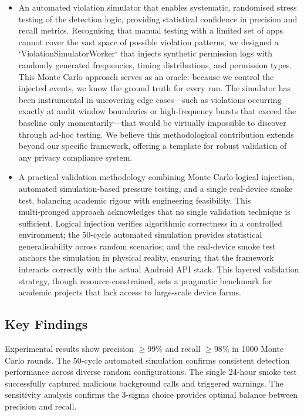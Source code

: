 \begin{itemize}
\item An automated violation simulator that enables systematic, randomised stress testing of the detection logic, providing statistical confidence in precision and recall metrics. Recognising that manual testing with a limited set of apps cannot cover the vast space of possible violation patterns, we designed a `ViolationSimulatorWorker` that injects synthetic permission logs with randomly generated frequencies, timing distributions, and permission types. This Monte Carlo approach serves as an oracle: because we control the injected events, we know the ground truth for every run. The simulator has been instrumental in uncovering edge cases—such as violations occurring exactly at audit window boundaries or high‑frequency bursts that exceed the baseline only momentarily—that would be virtually impossible to discover through ad‑hoc testing. We believe this methodological contribution extends beyond our specific framework, offering a template for robust validation of any privacy compliance system.

\item A practical validation methodology combining Monte Carlo logical injection, automated simulation-based pressure testing, and a single real-device smoke test, balancing academic rigour with engineering feasibility. This multi‑pronged approach acknowledges that no single validation technique is sufficient. Logical injection verifies algorithmic correctness in a controlled environment; the 50‑cycle automated simulation provides statistical generalisability across random scenarios; and the real‑device smoke test anchors the simulation in physical reality, ensuring that the framework interacts correctly with the actual Android API stack. This layered validation strategy, though resource‑constrained, sets a pragmatic benchmark for academic projects that lack access to large‑scale device farms.
\end{itemize}

\subsection{Key Findings}
Experimental results show precision $\ge 99\%$ and recall $\ge 98\%$ in 1000 Monte Carlo rounds. The 50-cycle automated simulation confirms consistent detection performance across diverse random configurations. The single 24-hour smoke test successfully captured malicious background calls and triggered warnings. The sensitivity analysis confirms the 3-sigma choice provides optimal balance between precision and recall.

